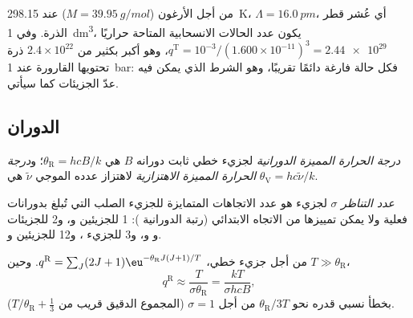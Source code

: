 \begin{example}\label{ex:b3:partition-functions:argon}
من أجل الأرغون ($M = \qty{39.95}{g/mol}$) عند \qty{298.15}{K}، $\Lambda = \qty{16.0}{pm}$، أي عُشر
قطر الذرة. وفي \qty{1}{dm^3}، يكون عدد الحالات الانسحابية المتاحة حراريًا $q^{\mathrm T} = 10^{-3}/(1.600\times10^{-11})^3 = \num{2.44e29}$،
وهو أكبر بكثير من
$2.4\times10^{22}$ ذرة تحتويها القارورة عند \qty{1}{bar}: فكل حالة فارغة دائمًا تقريبًا،
وهو الشرط الذي يمكن فيه عدّ الجزيئات كما سيأتي.
\end{example}

\subsection*{الدوران}

\begin{definition}\label{def:b3:partition-functions:characteristic-temperature}
\emph{درجة الحرارة المميزة الدورانية}
لجزيء خطي ثابت دورانه $B$ هي $\theta_{\mathrm R} =
hcB/k$؛ و\emph{درجة الحرارة المميزة الاهتزازية}
لاهتزاز عدده الموجي $\tilde\nu$ هي $\theta_{\mathrm V} =
hc\tilde\nu/k$.
\end{definition}

\begin{definition}\label{def:b3:partition-functions:symmetry-number}
\emph{عدد التناظر} $\sigma$ لجزيء هو
عدد الاتجاهات المتمايزة للجزيء الصلب التي تُبلغ بدورانات
فعلية ولا يمكن تمييزها من الاتجاه الابتدائي (رتبة
 الدورانية ): 1 للجزيئين  و، و2 للجزيئات 
و و، و3 للجزيء ، و12 للجزيئين  و.
\end{definition}

\begin{proposition}\label{prop:b3:partition-functions:q-rot}
من أجل جزيء خطي، $q^{\mathrm R} = \sum_J(2J+1)\eu^{-\theta_{\mathrm R}J(J+1)/T}$. وحين $T \gg
\theta_{\mathrm R}$،
\[
  q^{\mathrm R} \approx \frac{T}{\sigma\theta_{\mathrm R}} = \frac{kT}{\sigma hcB},
\]
بخطأ نسبي قدره نحو $\theta_{\mathrm R}/3T$ من أجل $\sigma = 1$ (المجموع الدقيق قريب
من $T/\theta_{\mathrm R} + \frac13$).
\end{proposition}

